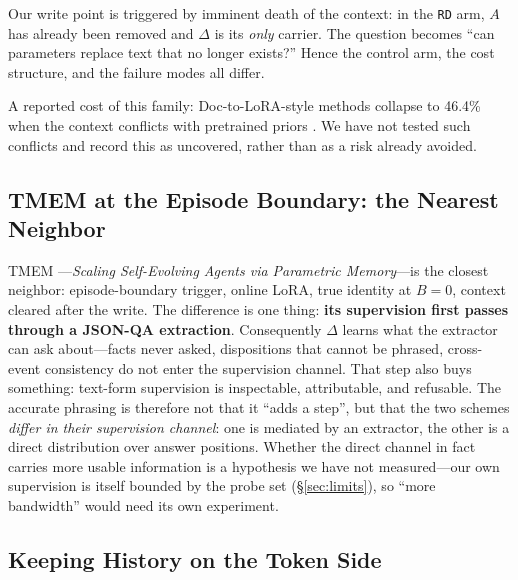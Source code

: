 \documentclass[sigconf,nonacm]{acmart}
\newcommand{\armRD}{\texttt{RD}}
\begin{document}
Our write point is triggered by imminent death of the context: in the \armRD{} arm, $A$ has already been
removed and $\Delta$ is its \emph{only} carrier. The question becomes ``can parameters replace text that
no longer exists?'' Hence the control arm, the cost structure, and the failure modes all differ.

A reported cost of this family: Doc-to-LoRA-style methods collapse to 46.4\% when the context conflicts
with pretrained priors \cite{overridegap2026}. We have not tested such conflicts and record this as
uncovered, rather than as a risk already avoided.

\subsection{TMEM at the Episode Boundary: the Nearest Neighbor}

TMEM \cite{tmem2026}---\emph{Scaling Self-Evolving Agents via Parametric Memory}---is the closest neighbor: episode-boundary trigger, online LoRA, true identity at
$B{=}0$, context cleared after the write. The difference is one thing: \textbf{its supervision first
passes through a JSON-QA extraction}. Consequently $\Delta$ learns what the extractor can ask
about---facts never asked, dispositions that cannot be phrased, cross-event consistency do not enter the
supervision channel. That step also buys something: text-form supervision is inspectable, attributable,
and refusable. The accurate phrasing is therefore not that it ``adds a step'', but that the two schemes
\emph{differ in their supervision channel}: one is mediated by an extractor, the other is a direct distribution
over answer positions. Whether the direct channel in fact carries more usable information is a hypothesis we have
not measured---our own supervision is itself bounded by the probe set (\S\ref{sec:limits}), so ``more bandwidth''
would need its own experiment.

\subsection{Keeping History on the Token Side}
\end{document}
